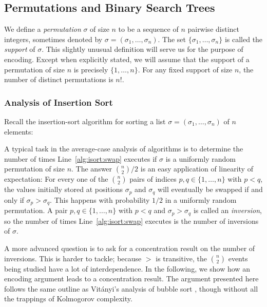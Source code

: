 \documentclass{patmorin}
\begin{document}
\subsection{Permutations and Binary Search Trees}

We define a \emph{permutation} $\sigma$ of size $n$ to be a sequence
of $n$ pairwise distinct integers, sometimes denoted by
$\sigma = (\sigma_1, \dots, \sigma_n)$. The set
$\{\sigma_1, \dots, \sigma_n\}$ is called the
\emph{support} of $\sigma$. This slightly unusual
definition will serve us for the purpose of encoding. Except when
explicitly stated, we will assume that the support of a permutation
of size $n$
is precisely $\{1, \dots, n\}$. For any fixed support of
size $n$, the number of distinct permutations 
is $n!$.

\subsubsection{Analysis of Insertion Sort}

Recall the insertion-sort algorithm for sorting a list
$\sigma = (\sigma_1,\ldots,\sigma_n)$ of $n$ elements:

\begin{algorithmic}[1]
         \label{alg:isort:swap}
     \ENDWHILE
  \ENDFOR
\end{algorithmic}

A typical task in the average-case analysis of algorithms is to
determine the number of times Line~\ref{alg:isort:swap} executes 
if $\sigma$ is a
uniformly random permutation of size $n$.  The answer
$\binom{n}{2}/2$ is an easy application of linearity of expectation:
For every one of the $\binom{n}{2}$ pairs of indices 
$p,q\in\{1,\dots,n\}$ with
$p<q$, the values initially stored at positions $\sigma_p$ and
$\sigma_q$ will eventually be swapped if and only if
$\sigma_p > \sigma_q$. This happens with probability $1/2$ in a
uniformly random permutation. A pair $p, q \in \{1, \dots, n\}$ with
$p < q$ and $\sigma_p > \sigma_q$ is called an
\emph{inversion}, so the number of times Line~\ref{alg:isort:swap} 
executes is the number
of inversions of $\sigma$.

A more advanced question is to ask for a concentration result on the
number of inversions. This is harder to tackle; because $>$
is transitive, the $\binom{n}{2}$ events being studied have a lot of
interdependence. In the following, we show how an encoding argument
leads to a concentration result.  The argument
presented here follows the same outline as Vit\'{a}nyi's analysis of
bubble sort \cite{vitanyi:analysis}, though without all the trappings
of Kolmogorov complexity.
\end{document}
